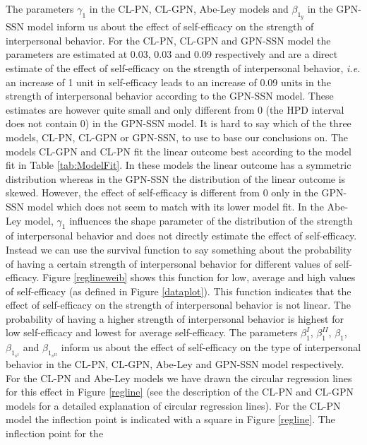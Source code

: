 \documentclass[man,mask]{apa6}
\begin{document}
The parameters \(\gamma_1\) in the CL-PN, CL-GPN, Abe-Ley models and \(\beta_{1_y}\)
in the GPN-SSN model inform us about the effect of self-efficacy on the strength
of interpersonal behavior. For the CL-PN, CL-GPN and GPN-SSN model the
parameters are estimated at 0.03, 0.03 and 0.09 respectively and are a direct
estimate of the effect of self-efficacy on the strength of interpersonal
behavior, \emph{i.e.} an increase of 1 unit in self-efficacy leads to an
increase of 0.09 units in the strength of interpersonal behavior according to
the GPN-SSN model. These estimates are however quite small and only different
from 0 (the HPD interval does not contain 0) in the GPN-SSN model. It is hard to
say which of the three models, CL-PN, CL-GPN or GPN-SSN, to use to base our
conclusions on. The models CL-GPN and CL-PN fit the linear outcome best according
to the model fit in Table \ref{tab:ModelFit}. In these models the linear outcome has a
symmetric distribution whereas in the GPN-SSN the distribution of the linear
outcome is skewed. However, the effect of self-efficacy is different from 0 only
in the GPN-SSN model which does not seem to match with its lower model fit.\newline
\indent In the Abe-Ley model, \(\gamma_1\) influences the shape parameter of the distribution of
the strength of interpersonal behavior and does not directly estimate the effect
of self-efficacy. Instead we can use the survival function to say something
about the probability of having a certain strength of interpersonal behavior for
different values of self-efficacy. Figure \ref{reglineweib} shows this function
for low, average and high values of self-efficacy (as defined in Figure
\ref{dataplot}). This function indicates that the effect of self-efficacy on the
strength of interpersonal behavior is not linear. The probability of having a
higher strength of interpersonal behavior is highest for low self-efficacy and
lowest for average self-efficacy.\newline
\indent The parameters \(\beta_1^{I}\), \(\beta_1^{II}\), \(\beta_1\),
\(\beta_{1_{s^{I}}}\) and \(\beta_{1_{s^{II}}}\) inform us about the effect of
self-efficacy on the type of interpersonal behavior in the CL-PN, CL-GPN,
Abe-Ley and GPN-SSN model respectively. For the CL-PN and Abe-Ley models we have
drawn the circular regression lines for this effect in Figure \ref{regline} (see
the description of the CL-PN and CL-GPN models for a detailed explanation of
circular regression lines). For the CL-PN model the inflection point is
indicated with a square in Figure \ref{regline}. The inflection point for the
\end{document}
